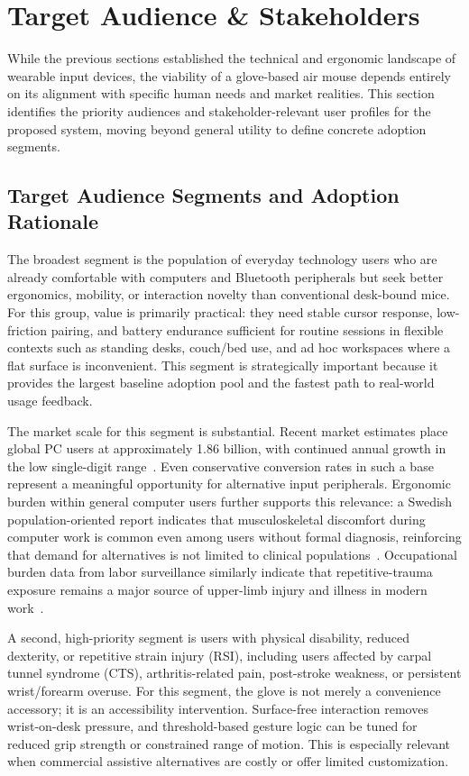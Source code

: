\section{Target Audience \& Stakeholders}

While the previous sections established the technical and ergonomic landscape of wearable input devices, the viability of a glove-based air mouse depends entirely on its alignment with specific human needs and market realities. This section identifies the priority audiences and stakeholder-relevant user profiles for the proposed system, moving beyond general utility to define concrete adoption segments.

\subsection{Target Audience Segments and Adoption Rationale}

The broadest segment is the population of everyday technology users who are already comfortable with computers and Bluetooth peripherals but seek better ergonomics, mobility, or interaction novelty than conventional desk-bound mice. For this group, value is primarily practical: they need stable cursor response, low-friction pairing, and battery endurance sufficient for routine sessions in flexible contexts such as standing desks, couch/bed use, and ad hoc workspaces where a flat surface is inconvenient. This segment is strategically important because it provides the largest baseline adoption pool and the fastest path to real-world usage feedback.

The market scale for this segment is substantial. Recent market estimates place global PC users at approximately 1.86 billion, with continued annual growth in the low single-digit range~\cite{explodingtopics_pc_users_2024}. Even conservative conversion rates in such a base represent a meaningful opportunity for alternative input peripherals. Ergonomic burden within general computer users further supports this relevance: a Swedish population-oriented report indicates that musculoskeletal discomfort during computer work is common even among users without formal diagnosis, reinforcing that demand for alternatives is not limited to clinical populations~\cite{arbetsmiljoverket_workrelated_disorders_2024}. Occupational burden data from labor surveillance similarly indicate that repetitive-trauma exposure remains a major source of upper-limb injury and illness in modern work~\cite{bls_iif_2024}.

A second, high-priority segment is users with physical disability, reduced dexterity, or repetitive strain injury (RSI), including users affected by carpal tunnel syndrome (CTS), arthritis-related pain, post-stroke weakness, or persistent wrist/forearm overuse. For this segment, the glove is not merely a convenience accessory; it is an accessibility intervention. Surface-free interaction removes wrist-on-desk pressure, and threshold-based gesture logic can be tuned for reduced grip strength or constrained range of motion. This is especially relevant when commercial assistive alternatives are costly or offer limited customization.

